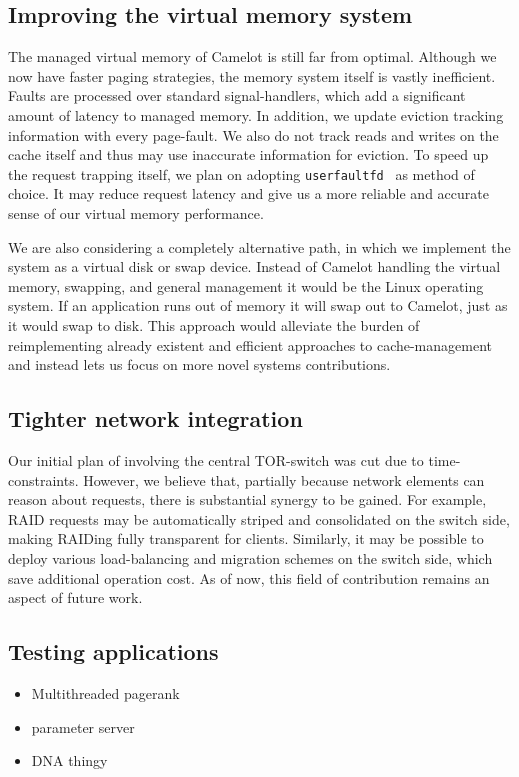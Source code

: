 \subsection{Improving the virtual memory system}
The managed virtual memory of Camelot is still far from optimal. Although we now have faster paging strategies, the memory system itself is vastly inefficient. Faults are processed over standard signal-handlers, which add a significant amount of latency to managed memory. In addition, we update eviction tracking information with every page-fault. We also do not track reads and writes on the cache itself and thus may use inaccurate information for eviction.
To speed up the request trapping itself, we plan on adopting \texttt{userfaultfd}~\cite{userfaultfd} as method of choice. It may reduce request latency and give us a more reliable and accurate sense of our virtual memory performance.

We are also considering a completely alternative path, in which we implement the system as a virtual disk or swap device. Instead of Camelot handling the virtual memory, swapping, and general management it would be the Linux operating system. If an application runs out of memory it will swap out to Camelot, just as it would swap to disk. This approach would alleviate the burden of reimplementing already existent and efficient approaches to cache-management and instead lets us focus on more novel systems contributions.

\subsection{Tighter network integration}
Our initial plan of involving the central TOR-switch was cut due to time-constraints. However, we believe that, partially because network elements can reason about requests, there is substantial synergy to be gained. For example, RAID requests may be automatically striped and consolidated on the switch side, making RAIDing fully transparent for clients. Similarly, it may be possible to deploy various load-balancing and migration schemes on the switch side, which save additional operation cost. 
As of now, this field of contribution remains an aspect of future work.

\subsection{Testing applications}
\begin{itemize}
\item Multithreaded pagerank
\item parameter server
\item DNA thingy
\end{itemize}


\label{sec:future}

